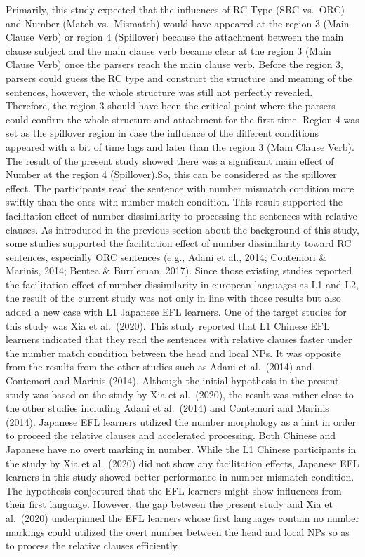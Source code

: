 \documentclass[
]{article}
\begin{document}
Primarily, this study expected that the influences of RC Type (SRC
vs.~ORC) and Number (Match vs.~Mismatch) would have appeared at the
region 3 (Main Clause Verb) or region 4 (Spillover) because the
attachment between the main clause subject and the main clause verb
became clear at the region 3 (Main Clause Verb) once the parsers reach
the main clause verb. Before the region 3, parsers could guess the RC
type and construct the structure and meaning of the sentences, however,
the whole structure was still not perfectly revealed. Therefore, the
region 3 should have been the critical point where the parsers could
confirm the whole structure and attachment for the first time. Region 4
was set as the spillover region in case the influence of the different
conditions appeared with a bit of time lags and later than the region 3
(Main Clause Verb). The result of the present study showed there was a
significant main effect of Number at the region 4 (Spillover).So, this
can be considered as the spillover effect. The participants read the
sentence with number mismatch condition more swiftly than the ones with
number match condition. This result supported the facilitation effect of
number dissimilarity to processing the sentences with relative clauses.
As introduced in the previous section about the background of this
study, some studies supported the facilitation effect of number
dissimilarity toward RC sentences, especially ORC sentences (e.g., Adani
et al., 2014; Contemori \& Marinis, 2014; Bentea \& Burrleman, 2017).
Since those existing studies reported the facilitation effect of number
dissimilarity in european languages as L1 and L2, the result of the
current study was not only in line with those results but also added a
new case with L1 Japanese EFL learners. One of the target studies for
this study was Xia et al.~(2020). This study reported that L1 Chinese
EFL learners indicated that they read the sentences with relative
clauses faster under the number match condition between the head and
local NPs. It was opposite from the results from the other studies such
as Adani et al.~(2014) and Contemori and Marinis (2014). Although the
initial hypothesis in the present study was based on the study by Xia et
al.~(2020), the result was rather close to the other studies including
Adani et al.~(2014) and Contemori and Marinis (2014). Japanese EFL
learners utilized the number morphology as a hint in order to proceed
the relative clauses and accelerated processing. Both Chinese and
Japanese have no overt marking in number. While the L1 Chinese
participants in the study by Xia et al.~(2020) did not show any
facilitation effects, Japanese EFL learners in this study showed better
performance in number mismatch condition. The hypothesis conjectured
that the EFL learners might show influences from their first language.
However, the gap between the present study and Xia et al.~(2020)
underpinned the EFL learners whose first languages contain no number
markings could utilized the overt number between the head and local NPs
so as to process the relative clauses efficiently.
\end{document}
